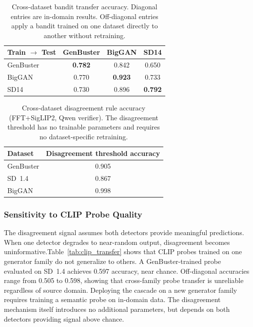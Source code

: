 \documentclass{ieeeaccess}
\begin{document}
\begin{table}[h]
\centering
\caption{Cross-dataset bandit transfer accuracy. Diagonal entries are in-domain results. Off-diagonal entries apply a bandit trained on one dataset directly to another without retraining.}
\label{tab:transfer}
\begin{tabular}{lccc}
\toprule
Train $\rightarrow$ Test & GenBuster & BigGAN & SD14 \\
\midrule
GenBuster & \textbf{0.782} & 0.842 & 0.650 \\
BigGAN    & 0.770 & \textbf{0.923} & 0.733 \\
SD14      & 0.730 & 0.896 & \textbf{0.792} \\
\bottomrule
\end{tabular}
\end{table}



\begin{table}[h]
\centering
\caption{Cross-dataset disagreement rule accuracy (FFT+SigLIP2, Qwen verifier). The
disagreement threshold has no trainable parameters and requires no dataset-specific
retraining.}
\label{tab:disagree_transfer}
\begin{tabular}{lc}
\toprule
Dataset & Disagreement threshold accuracy \\
\midrule
GenBuster & 0.905 \\
SD~1.4    & 0.867 \\
BigGAN    & 0.998 \\
\bottomrule
\end{tabular}
\end{table}


\subsubsection{Sensitivity to CLIP Probe Quality}

The disagreement signal assumes both detectors provide meaningful predictions. When one detector degrades to near-random output, disagreement becomes uninformative.Table~\ref{tab:clip_transfer} shows that CLIP probes trained on one generator family do not generalize to others. A GenBuster-trained probe evaluated on SD~1.4 achieves 0.597
accuracy, near chance. Off-diagonal accuracies range from 0.505 to 0.598, showing that
cross-family probe transfer is unreliable regardless of source domain. Deploying the
cascade on a new generator family requires training a semantic probe on in-domain data.
The disagreement mechanism itself introduces no additional parameters, but depends on
both detectors providing signal above chance.
\end{document}
